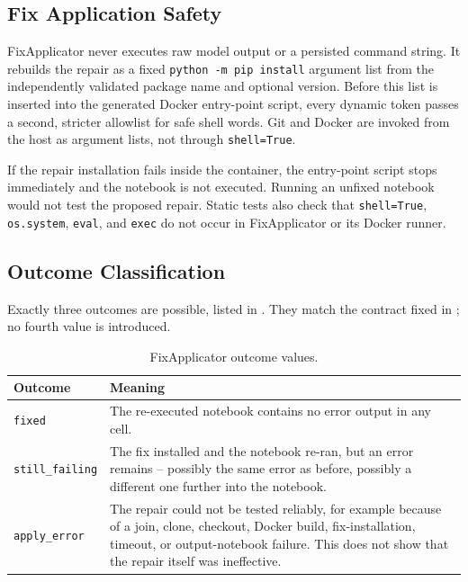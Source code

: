 \subsection{Fix Application Safety}

FixApplicator never executes raw model output or a persisted command string.
It rebuilds the repair as a fixed \texttt{python -m pip install} argument list
from the independently validated package name and optional version. Before this
list is inserted into the generated Docker entry-point script, every dynamic
token passes a second, stricter allowlist for safe shell words. Git and Docker
are invoked from the host as argument lists, not through \texttt{shell=True}.

If the repair installation fails inside the container, the entry-point script
stops immediately and the notebook is not executed. Running an unfixed notebook
would not test the proposed repair. Static tests also check that
\texttt{shell=True}, \texttt{os.system}, \texttt{eval}, and \texttt{exec} do
not occur in FixApplicator or its Docker runner.

\subsection{Outcome Classification}

Exactly three outcomes are possible, listed in . They
match the contract fixed in ; no fourth value is
introduced.

\begin{table}[htbp]
  \centering
  \begin{tabular}{|l|p{9.3cm}|}
    \hline
    \textbf{Outcome} & \textbf{Meaning} \\
    \hline
    \texttt{fixed} & The re-executed notebook contains no error output in any cell. \\
    \hline
    \texttt{still\_failing} & The fix installed and the notebook re-ran, but an error remains -- possibly the same error as before, possibly a different one further into the notebook. \\
    \hline
    \texttt{apply\_error} & The repair could not be tested reliably, for example because of a join, clone, checkout, Docker build, fix-installation, timeout, or output-notebook failure. This does not show that the repair itself was ineffective. \\
    \hline
  \end{tabular}
  \caption{FixApplicator outcome values.}
  \label{tab:m-outcomes}
\end{table}

